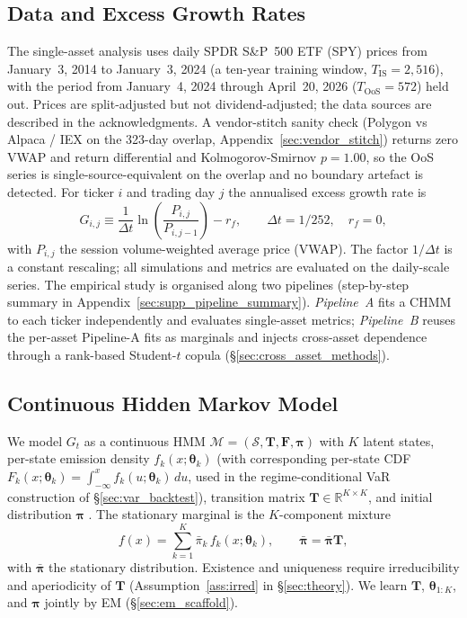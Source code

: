 \subsection{Data and Excess Growth Rates}
\label{sec:data}

The single-asset analysis uses daily SPDR S\&P~500 ETF (SPY) prices from January~3, 2014 to January~3, 2024 (a ten-year training window, $T_{\text{IS}} = 2{,}516$), with the period from January~4, 2024 through April~20, 2026 ($T_{\text{OoS}} = 572$) held out. Prices are split-adjusted but not dividend-adjusted; the data sources are described in the acknowledgments. A vendor-stitch sanity check (Polygon vs Alpaca / IEX on the 323-day overlap, Appendix~\ref{sec:vendor_stitch}) returns zero VWAP and return differential and Kolmogorov-Smirnov $p = 1.00$, so the OoS series is single-source-equivalent on the overlap and no boundary artefact is detected. For ticker $i$ and trading day $j$ the annualised excess growth rate is
\begin{equation}
    G_{i,j} \equiv \frac{1}{\Delta t} \ln\!\left(\frac{P_{i,j}}{P_{i,j-1}}\right) - r_f, \qquad \Delta t = 1/252, \quad r_f = 0,
    \label{eq:growth_rate}
\end{equation}
with $P_{i,j}$ the session volume-weighted average price (VWAP). The factor $1/\Delta t$ is a constant rescaling; all simulations and metrics are evaluated on the daily-scale series. The empirical study is organised along two pipelines (step-by-step summary in Appendix~\ref{sec:supp_pipeline_summary}). \emph{Pipeline~A} fits a CHMM to each ticker independently and evaluates single-asset metrics; \emph{Pipeline~B} reuses the per-asset Pipeline-A fits as marginals and injects cross-asset dependence through a rank-based Student-$t$ copula (\S\ref{sec:cross_asset_methods}).

\subsection{Continuous Hidden Markov Model}
\label{sec:chmm_def}

We model $G_t$ as a continuous HMM $\mathcal{M} = (\mathcal{S}, \mathbf{T}, \mathbf{F}, \boldsymbol{\pi})$ with $K$ latent states, per-state emission density $f_k(x; \boldsymbol\theta_k)$ (with corresponding per-state CDF $F_k(x; \boldsymbol\theta_k) = \int_{-\infty}^x f_k(u; \boldsymbol\theta_k)\,du$, used in the regime-conditional VaR construction of \S\ref{sec:var_backtest}), transition matrix $\mathbf{T} \in \mathbb{R}^{K \times K}$, and initial distribution $\boldsymbol{\pi}$ \cite{rabiner1986introduction}. The stationary marginal is the $K$-component mixture
\begin{equation}
    f(x) = \sum_{k=1}^{K} \bar{\pi}_k\, f_k(x; \boldsymbol\theta_k), \qquad \bar{\boldsymbol{\pi}} = \bar{\boldsymbol{\pi}} \mathbf{T},
    \label{eq:mixture}
\end{equation}
with $\bar{\boldsymbol\pi}$ the stationary distribution. Existence and uniqueness require irreducibility and aperiodicity of $\mathbf T$ (Assumption~\ref{ass:irred} in \S\ref{sec:theory}). We learn $\mathbf{T}$, $\boldsymbol\theta_{1:K}$, and $\boldsymbol{\pi}$ jointly by EM (\S\ref{sec:em_scaffold}).

